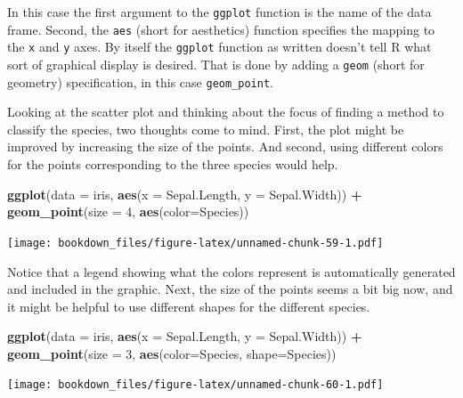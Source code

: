 \documentclass[
]{krantz}
\makeatletter
\newenvironment{Shaded}{\begin{snugshade}}{\end{snugshade}}
\newcommand{\DataTypeTok}[1]{\textcolor[rgb]{0.27,0.27,0.27}{#1}}
\newcommand{\DecValTok}[1]{\textcolor[rgb]{0.06,0.06,0.06}{#1}}
\newcommand{\KeywordTok}[1]{\textcolor[rgb]{0.27,0.27,0.27}{\textbf{#1}}}
\newcommand{\NormalTok}[1]{#1}
\newcommand{\OperatorTok}[1]{\textcolor[rgb]{0.43,0.43,0.43}{\textbf{#1}}}
\newcommand{\StringTok}[1]{\textcolor[rgb]{0.5,0.5,0.5}{#1}}
\newenvironment{kframe}{%
\medskip{}
\setlength{\fboxsep}{.8em}
 \def\at@end@of@kframe{}%
 \ifinner\ifhmode%
  \def\at@end@of@kframe{\end{minipage}}%
  \begin{minipage}{\columnwidth}%
 \fi\fi%
 \def\FrameCommand##1{\hskip\@totalleftmargin \hskip-\fboxsep
 \colorbox{shadecolor}{##1}\hskip-\fboxsep
     \hskip-\linewidth \hskip-\@totalleftmargin \hskip\columnwidth}%
 \MakeFramed {\advance\hsize-\width
   \@totalleftmargin\z@ \linewidth\hsize
   \@setminipage}}%
 {\par\unskip\endMakeFramed%
 \at@end@of@kframe}
\renewenvironment{Shaded}{\begin{kframe}}{\end{kframe}}
\makeatother
\begin{document}
In this case the first argument to the \texttt{ggplot} function is the name of the data frame. Second, the \texttt{aes} (short for aesthetics) function specifies the mapping to the \texttt{x} and \texttt{y} axes. By itself the \texttt{ggplot} function as written doesn't tell R what sort of graphical display is desired. That is done by adding a \texttt{geom} (short for geometry) specification, in this case \texttt{geom\_point}.

Looking at the scatter plot and thinking about the focus of finding a method to classify the species, two thoughts come to mind. First, the plot might be improved by increasing the size of the points. And second, using different colors for the points corresponding to the three species would help.

\begin{Shaded}
\begin{Highlighting}[]
\KeywordTok{ggplot}\NormalTok{(}\DataTypeTok{data =}\NormalTok{ iris, }\KeywordTok{aes}\NormalTok{(}\DataTypeTok{x =}\NormalTok{ Sepal.Length, }\DataTypeTok{y =}\NormalTok{ Sepal.Width)) }\OperatorTok{+}\StringTok{ }
\StringTok{    }\KeywordTok{geom\_point}\NormalTok{(}\DataTypeTok{size =} \DecValTok{4}\NormalTok{, }\KeywordTok{aes}\NormalTok{(}\DataTypeTok{color=}\NormalTok{Species))}
\end{Highlighting}
\end{Shaded}

\texttt{[image: bookdown\_files/figure-latex/unnamed-chunk-59-1.pdf]}

Notice that a legend showing what the colors represent is automatically generated and included in the graphic. Next, the size of the points seems a bit big now, and it might be helpful to use different shapes for the different species.

\begin{Shaded}
\begin{Highlighting}[]
\KeywordTok{ggplot}\NormalTok{(}\DataTypeTok{data =}\NormalTok{ iris, }\KeywordTok{aes}\NormalTok{(}\DataTypeTok{x =}\NormalTok{ Sepal.Length, }\DataTypeTok{y =}\NormalTok{ Sepal.Width)) }\OperatorTok{+}\StringTok{ }
\StringTok{    }\KeywordTok{geom\_point}\NormalTok{(}\DataTypeTok{size =} \DecValTok{3}\NormalTok{, }\KeywordTok{aes}\NormalTok{(}\DataTypeTok{color=}\NormalTok{Species, }\DataTypeTok{shape=}\NormalTok{Species))}
\end{Highlighting}
\end{Shaded}

\texttt{[image: bookdown\_files/figure-latex/unnamed-chunk-60-1.pdf]}
\end{document}
